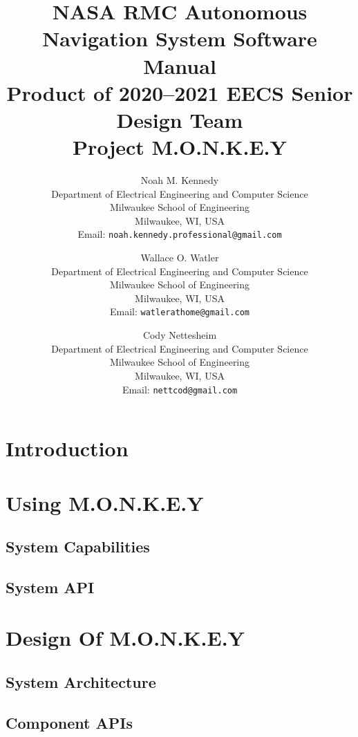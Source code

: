 \documentclass[8pt]{report}
\title{
    NASA RMC Autonomous Navigation System Software Manual \\
    Product of 2020--2021 EECS Senior Design Team \\
    Project M.O.N.K.E.Y
}
\author{
    Noah M. Kennedy \\[3pt]
    {\small Department of Electrical Engineering and Computer Science} \\
    {\small Milwaukee School of Engineering} \\
    {\small Milwaukee, WI, USA} \\
    {\small Email: {\texttt{noah.kennedy.professional@gmail.com} }} \\[12pt]
    \and
    Wallace O. Watler \\[3pt]
    {\small Department of Electrical Engineering and Computer Science} \\
    {\small Milwaukee School of Engineering} \\
    {\small Milwaukee, WI, USA} \\
    {\small Email: {\texttt{watlerathome@gmail.com} }} \\[12pt]
    \and
    Cody Nettesheim \\[3pt]
    {\small Department of Electrical Engineering and Computer Science} \\
    {\small Milwaukee School of Engineering} \\
    {\small Milwaukee, WI, USA} \\
    {\small Email: {\texttt{nettcod@gmail.com} }} \\[12pt]
}
\begin{document}
    \maketitle
    \newpage


    \tableofcontents
    \newpage


    \chapter{Introduction}\label{ch:introduction}
    
    \newpage


    \chapter{Using M.O.N.K.E.Y}\label{ch:using-monkey}
    \newpage


    \section{System Capabilities}\label{sec:system-capabilities}
    \newpage


    \section{System API}\label{sec:system-api}
    
    \newpage


    \chapter{Design Of M.O.N.K.E.Y}\label{ch:design-of-monkey}
    \newpage


    \section{System Architecture}\label{sec:system-architecture}
    
    \newpage


    \section{Component APIs}\label{sec:components}
    
    \newpage

    \printbibliography
\end{document}
